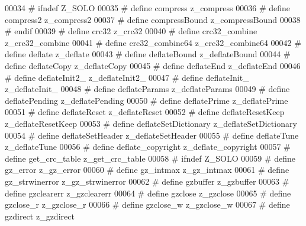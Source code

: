 \begin{DoxyCode}
00034 \textcolor{preprocessor}{#  ifndef Z\_SOLO}
00035 \textcolor{preprocessor}{#    define compress              z\_compress}
00036 \textcolor{preprocessor}{#    define compress2             z\_compress2}
00037 \textcolor{preprocessor}{#    define compressBound         z\_compressBound}
00038 \textcolor{preprocessor}{#  endif}
00039 \textcolor{preprocessor}{#  define crc32                 z\_crc32}
00040 \textcolor{preprocessor}{#  define crc32\_combine         z\_crc32\_combine}
00041 \textcolor{preprocessor}{#  define crc32\_combine64       z\_crc32\_combine64}
00042 \textcolor{preprocessor}{#  define deflate               z\_deflate}
00043 \textcolor{preprocessor}{#  define deflateBound          z\_deflateBound}
00044 \textcolor{preprocessor}{#  define deflateCopy           z\_deflateCopy}
00045 \textcolor{preprocessor}{#  define deflateEnd            z\_deflateEnd}
00046 \textcolor{preprocessor}{#  define deflateInit2\_         z\_deflateInit2\_}
00047 \textcolor{preprocessor}{#  define deflateInit\_          z\_deflateInit\_}
00048 \textcolor{preprocessor}{#  define deflateParams         z\_deflateParams}
00049 \textcolor{preprocessor}{#  define deflatePending        z\_deflatePending}
00050 \textcolor{preprocessor}{#  define deflatePrime          z\_deflatePrime}
00051 \textcolor{preprocessor}{#  define deflateReset          z\_deflateReset}
00052 \textcolor{preprocessor}{#  define deflateResetKeep      z\_deflateResetKeep}
00053 \textcolor{preprocessor}{#  define deflateSetDictionary  z\_deflateSetDictionary}
00054 \textcolor{preprocessor}{#  define deflateSetHeader      z\_deflateSetHeader}
00055 \textcolor{preprocessor}{#  define deflateTune           z\_deflateTune}
00056 \textcolor{preprocessor}{#  define deflate\_copyright     z\_deflate\_copyright}
00057 \textcolor{preprocessor}{#  define get\_crc\_table         z\_get\_crc\_table}
00058 \textcolor{preprocessor}{#  ifndef Z\_SOLO}
00059 \textcolor{preprocessor}{#    define gz\_error              z\_gz\_error}
00060 \textcolor{preprocessor}{#    define gz\_intmax             z\_gz\_intmax}
00061 \textcolor{preprocessor}{#    define gz\_strwinerror        z\_gz\_strwinerror}
00062 \textcolor{preprocessor}{#    define gzbuffer              z\_gzbuffer}
00063 \textcolor{preprocessor}{#    define gzclearerr            z\_gzclearerr}
00064 \textcolor{preprocessor}{#    define gzclose               z\_gzclose}
00065 \textcolor{preprocessor}{#    define gzclose\_r             z\_gzclose\_r}
00066 \textcolor{preprocessor}{#    define gzclose\_w             z\_gzclose\_w}
00067 \textcolor{preprocessor}{#    define gzdirect              z\_gzdirect}

\end{DoxyCode}

